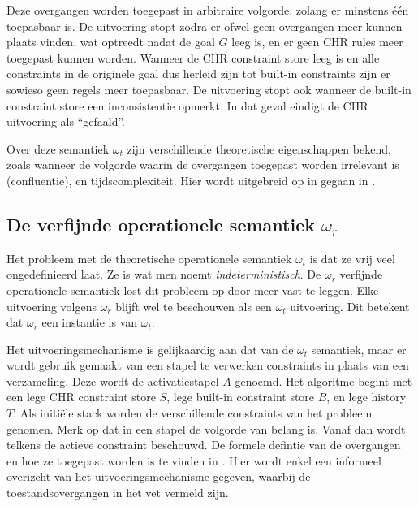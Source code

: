 Deze overgangen worden toegepast in arbitraire volgorde, zolang er minstens \'e\'en toepasbaar is. De uitvoering stopt zodra er ofwel geen overgangen meer kunnen plaats vinden, wat optreedt nadat de goal $G$ leeg is, en er geen CHR rules meer toegepast kunnen worden. Wanneer de CHR constraint store leeg is en alle constraints in de originele goal dus herleid zijn tot built-in constraints zijn er sowieso geen regels meer toepasbaar. De uitvoering stopt ook wanneer de built-in constraint store een inconsistentie opmerkt. In dat geval eindigt de CHR uitvoering als ``gefaald''.

Over deze semantiek $\omega_t$ zijn verschillende theoretische eigenschappen bekend, zoals wanneer de volgorde waarin de overgangen toegepast worden irrelevant is (confluentie), en tijdscomplexiteit. Hier wordt uitgebreid op in gegaan in \cite{tomsphdthesis}.

\subsection{De verfijnde operationele semantiek $\omega_r$}

Het probleem met de theoretische operationele semantiek $\omega_t$ is dat ze vrij veel ongedefinieerd laat. Ze is wat men noemt {\em indeterministisch}. De $\omega_r$ verfijnde operationele semantiek lost dit probleem op door meer vast te leggen. Elke uitvoering volgens $\omega_r$ blijft wel te beschouwen als een $\omega_t$ uitvoering. Dit betekent dat $\omega_r$ een instantie is van $\omega_t$. 

Het uitvoeringsmechanisme is gelijkaardig aan dat van de $\omega_t$ semantiek, maar er wordt gebruik gemaakt van een stapel te verwerken constraints in plaats van een verzameling. Deze wordt de activatiestapel $A$ genoemd. Het algoritme begint met een lege CHR constraint store $S$, lege built-in constraint store $B$, en lege history $T$. Als initi\"ele stack worden de verschillende constraints van het probleem genomen. Merk op dat in een stapel de volgorde van belang is. Vanaf dan wordt telkens de actieve constraint beschouwd. De formele defintie van de overgangen en hoe ze toegepast worden is te vinden in \cite{tomsphdthesis}. Hier wordt enkel een informeel overizcht van het uitvoeringsmechanisme gegeven, waarbij de toestandsovergangen in het vet vermeld zijn.

